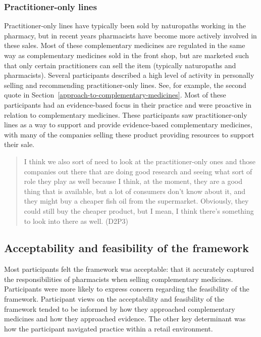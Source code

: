 \documentclass[11pt,a4paper]{article}
\begin{document}
\subsubsection{Practitioner-only lines}\label{practitioner-only-lines}

Practitioner-only lines have typically been sold by naturopaths working
in the pharmacy, but in recent years pharmacists have become more
actively involved in these sales. Most of these complementary medicines
are regulated in the same way as complementary medicines sold in the
front shop, but are marketed such that only certain practitioners can
sell the item (typically naturopaths and pharmacists). Several
participants described a high level of activity in personally selling
and recommending practitioner-only lines. See, for example, the second
quote in Section~\ref{approach-to-complementary-medicines}. Most of
these participants had an evidence-based focus in their practice and
were proactive in relation to complementary medicines. These
participants saw practitioner-only lines as a way to support and provide
evidence-based complementary medicines, with many of the companies
selling these product providing resources to support their sale.

\begin{quote}
I think we also sort of need to look at the practitioner-only ones and
those companies out there that are doing good research and seeing what
sort of role they play as well because I think, at the moment, they are
a good thing that is available, but a lot of consumers don't know about
it, and they might buy a cheaper fish oil from the supermarket.
Obviously, they could still buy the cheaper product, but I mean, I think
there's something to look into there as well. (D2P3)
\end{quote}

\subsection{Acceptability and feasibility of the
framework}\label{acceptability-and-feasibility-of-the-framework}

Most participants felt the framework was acceptable: that it accurately
captured the responsibilities of pharmacists when selling complementary
medicines. Participants were more likely to express concern regarding
the feasibility of the framework. Participant views on the acceptability
and feasibility of the framework tended to be informed by how they
approached complementary medicines and how they approached evidence. The
other key determinant was how the participant navigated practice within
a retail environment.
\end{document}
